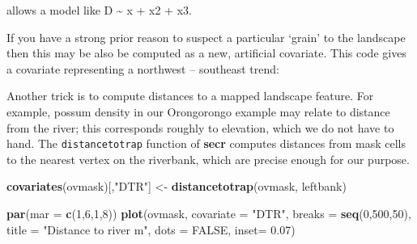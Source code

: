 \documentclass[
]{book}
\newenvironment{Shaded}{\begin{snugshade}}{\end{snugshade}}
\newcommand{\AttributeTok}[1]{\textcolor[rgb]{0.13,0.29,0.53}{#1}}
\newcommand{\ConstantTok}[1]{\textcolor[rgb]{0.56,0.35,0.01}{#1}}
\newcommand{\DecValTok}[1]{\textcolor[rgb]{0.00,0.00,0.81}{#1}}
\newcommand{\FloatTok}[1]{\textcolor[rgb]{0.00,0.00,0.81}{#1}}
\newcommand{\FunctionTok}[1]{\textcolor[rgb]{0.13,0.29,0.53}{\textbf{#1}}}
\newcommand{\NormalTok}[1]{#1}
\newcommand{\OtherTok}[1]{\textcolor[rgb]{0.56,0.35,0.01}{#1}}
\newcommand{\SpecialCharTok}[1]{\textcolor[rgb]{0.81,0.36,0.00}{\textbf{#1}}}
\newcommand{\StringTok}[1]{\textcolor[rgb]{0.31,0.60,0.02}{#1}}
\begin{document}
allows a model like D \textasciitilde{} x + x2 + x3.

If you have a strong prior reason to suspect a particular `grain' to the landscape then this may be also be computed as a new, artificial covariate. This code gives a covariate representing a northwest -- southeast trend:

\begin{Shaded}
\end{Shaded}

Another trick is to compute distances to a mapped landscape feature. For example, possum density in our Orongorongo example may relate to distance from the river; this corresponds roughly to elevation, which we do not have to hand. The \texttt{distancetotrap} function of \textbf{secr} computes distances from mask cells to the nearest vertex on the riverbank, which are precise enough for our purpose.

\begin{Shaded}
\begin{Highlighting}[]
\FunctionTok{covariates}\NormalTok{(ovmask)[,}\StringTok{"DTR"}\NormalTok{] }\OtherTok{\textless{}{-}} \FunctionTok{distancetotrap}\NormalTok{(ovmask, leftbank)}
\end{Highlighting}
\end{Shaded}

\begin{Shaded}
\begin{Highlighting}[]
\FunctionTok{par}\NormalTok{(}\AttributeTok{mar =} \FunctionTok{c}\NormalTok{(}\DecValTok{1}\NormalTok{,}\DecValTok{6}\NormalTok{,}\DecValTok{1}\NormalTok{,}\DecValTok{8}\NormalTok{))}
\FunctionTok{plot}\NormalTok{(ovmask, }\AttributeTok{covariate =} \StringTok{"DTR"}\NormalTok{, }\AttributeTok{breaks =} \FunctionTok{seq}\NormalTok{(}\DecValTok{0}\NormalTok{,}\DecValTok{500}\NormalTok{,}\DecValTok{50}\NormalTok{), }
     \AttributeTok{title =} \StringTok{"Distance to river m"}\NormalTok{, }\AttributeTok{dots =} \ConstantTok{FALSE}\NormalTok{, }\AttributeTok{inset=} \FloatTok{0.07}\NormalTok{)}
\end{Highlighting}
\end{Shaded}
\end{document}
